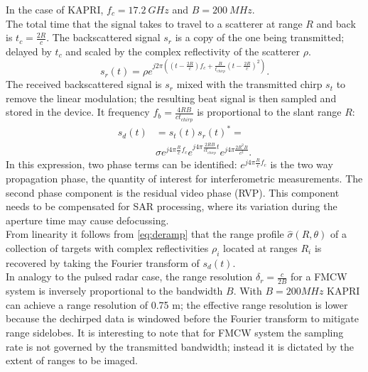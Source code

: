 In the case of KAPRI, $f_c= 17.2~GHz$ and $B=200~MHz$.\\
The total time that the signal takes to travel to a scatterer at range $R$ and back is $t_{c} = \frac{2 R}{c}$. The backscattered signal $s_r$ is a copy of the one being transmitted; delayed by $t_{c}$ and scaled by the complex reflectivity of the scatterer $\rho$.
\begin{equation}
		s_r\left(t\right) = \rho e^{j 2 \pi \left( \left(t - \frac{2 R}{c}\right) f_{c} +  \frac{B}{t_{chirp}} \left(t - \frac{2 R}{c}\right)^2 \right)}.
\end{equation}
The received backscattered signal is $s_r$  mixed with the transmitted chirp $s_t$  to remove the linear modulation; the resulting beat signal is then sampled and stored in the device. It frequency $f_{b} = \frac{4 R B}{c t_{chirp}}$ is proportional to the slant range $R$:
\begin{equation}\label{eq:deramp}
	\begin{aligned}
	s_{d}\left(t\right) &=s_t\left(t\right)s_r\left(t\right)^* =\\ 
	&\sigma e^{j 4 \pi \frac{ R}{c}f_c}  e^{j 4 \pi \frac{2 R B }{c t_{chirp}} t}  e^{j 4 \pi \frac{2 R^2 B}{c^2}}.
	\end{aligned}
\end{equation} 
In this expression, two phase terms can be identified: $ e^{j 4 \pi \frac{R}{c}f_c}$ is the two way propagation phase, the quantity of interest for  interferometric measurements. The second phase component is the residual video phase (RVP). This component needs to be compensated for SAR processing, where its variation during the aperture time may cause defocussing.\\
From  linearity it follows from \autoref{eq:deramp} that the range profile $\hat{\sigma}\left(R, \theta\right)$ of a collection of targets with complex reflectivities $\rho_i$ located at ranges $R_{i}$ is recovered by taking the Fourier transform of $s_{d}\left(t\right)$.\\
In analogy to the pulsed radar case, the range resolution $\delta_{r} = \frac{c}{2 B}$ for a FMCW system is inversely proportional to the bandwidth $B$. With $B=200 MHz$ KAPRI can achieve a range resolution of 0.75 m\cite{Strozzi2011}; the effective range resolution is lower because the dechirped data is windowed before the Fourier transform to mitigate range sidelobes. It is interesting to note that for FMCW system the sampling rate is not governed by the transmitted bandwidth; instead it is dictated by the extent of ranges to be imaged\cite{Meta2006}.\\
